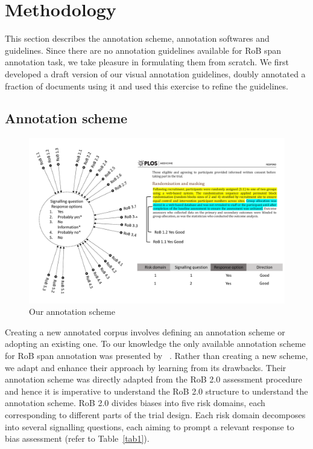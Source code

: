 \documentclass[sn-mathphys,Numbered]{sn-jnl}%
\theoremstyle{thmstyleone}%
\theoremstyle{thmstyletwo}%
\theoremstyle{thmstylethree}%
\begin{document}
\section{Methodology}
\label{sec:methods}
%
This section describes the annotation scheme, annotation softwares and guidelines.
Since there are no annotation guidelines available for RoB span annotation task, we take pleasure in formulating them from scratch. 
We first developed a draft version of our visual annotation guidelines, doubly annotated a fraction of documents using it and used this exercise to refine the guidelines.
%
%
%
\subsection{Annotation scheme}
\label{annot_scheme}
%

%
%
%
\begin{figure}
    \centering
    \includegraphics[width=0.90\columnwidth]{figures/annotation_schema.pdf}
    \caption{Our annotation scheme}
    \label{fig:annotationscheme}
\end{figure}
%
%
%



Creating a new annotated corpus involves defining an annotation scheme or adopting an existing one.
To our knowledge the only available annotation scheme for RoB span annotation was presented by ~\cite{dhrangadhariya2023first}.
Rather than creating a new scheme, we adapt and enhance their approach by learning from its drawbacks.
Their annotation scheme was directly adapted from the RoB 2.0 assessment procedure and hence it is imperative to understand the RoB 2.0 structure to understand the annotation scheme.
RoB 2.0 divides biases into five risk domains, each corresponding to different parts of the trial design.
Each risk domain decomposes into several signalling questions, each aiming to prompt a relevant response to bias assessment (refer to Table~\ref{tab1}).
\end{document}
